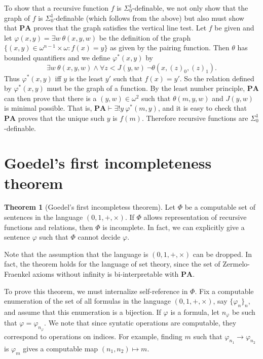 \documentclass[12pt]{report}
\newcommand{\PA}{\mathbf{PA}}
\newcommand{\proves}{\vdash}
\theoremstyle{definition}
\newtheorem{theorem}{Theorem}[chapter]
\begin{document}
To show that a recursive function $f$ is $\Sigma_0^1$-definable, we not only show that the graph of $f$ is $\Sigma_0^1$-definable (which follows from the above) but also must show that $\PA$ proves that the graph satisfies the vertical line test.
Let $f$ be given and let $\varphi(x, y) = \exists w ~\theta(x, y, w)$ be the definition of the graph $\{(x, y) \in \omega^{n-1} \times \omega: f(x) = y\}$ as given by the pairing function.
Then $\theta$ has bounded quantifiers and we define $\varphi^*(x, y)$ by
$$\exists w ~\theta(x, y, w) \wedge \forall z < J(y, w) ~\neg\theta(x, (z)_0, (z)_1).$$
Thus $\varphi^*(x, y)$ iff $y$ is the least $y'$ such that $f(x) = y'$. So the relation defined by $\varphi^*(x, y)$ must be the graph of a function.
By the least number principle, $\PA$ can then prove that there is a $(y, w) \in \omega^2$ such that $\theta(m, y, w)$ and $J(y, w)$ is minimal possible.
That is, $\PA \proves \exists!y~\varphi^*(m, y)$, and it is easy to check that $\PA$ proves that the unique such $y$ is $f(m)$.
Therefore recursive functions are $\Sigma_0^1$-definable.

\section{Goedel's first incompleteness theorem}
\begin{theorem}[Goedel's first incompletess theorem]
Let $\Phi$ be a computable set of sentences in the language $(0, 1, +, \times)$. If $\Phi$ allows representation of recursive functions and relations, then $\Phi$ is incomplete. In fact, we can explicitly give a sentence $\varphi$ such that $\Phi$ cannot decide $\varphi$.
\end{theorem}
Note that the assumption that the language is $(0, 1, +, \times)$ can be dropped. In fact, the theorem holds for the language of set theory, since the set of Zermelo-Fraenkel axioms without infinity is bi-interpretable with $\PA$.

To prove this theorem, we must internalize self-reference in $\Phi$. Fix a computable enumeration of the set of all formulas in the language $(0, 1, +, \times)$, say $\{\varphi_n\}_n$, and assume that this enumeration is a bijection. If $\varphi$ is a formula, let $n_\varphi$ be such that $\varphi = \varphi_{n_\varphi}$.
We note that since syntatic operations are computable, they correspond to operations on indices. For example, finding $m$ such that $\varphi_{n_1} \to \varphi_{n_2}$ is $\varphi_m$ gives a computable map $(n_1, n_2) \mapsto m$.
\end{document}

